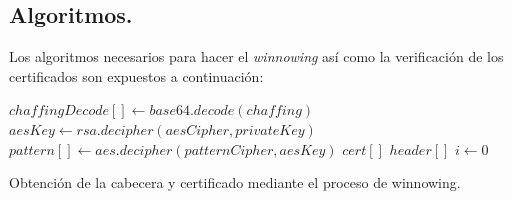 \documentclass[12pt, a4paper, titlepage]{report}
\begin{document}
            \subsection{Algoritmos.}
		        Los algoritmos necesarios para hacer el \textit{winnowing} así como la verificación de los certificados son expuestos a continuación:\\
                \begin{algorithm}[H]
                    \SetAlgoLined
                    
                    $chaffingDecode[] \longleftarrow base64.decode(chaffing)$\;
                    $aesKey \longleftarrow rsa.decipher(aesCipher, privateKey)$\;
                    $pattern[] \longleftarrow aes.decipher(patternCipher, aesKey)$\;
                    $cert[]$\;
                    $header[]$\;
                    $i \longleftarrow 0$\;
                    
                   
                    
                    \caption{Obtenci\'on de la cabecera y certificado mediante el proceso de winnowing.}
                \end{algorithm}
\end{document}
